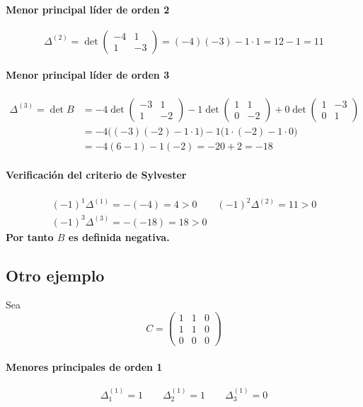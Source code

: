 \documentclass{article}
\begin{document}
\paragraph*{Menor principal líder de orden 2}
\[
\Delta^{(2)}=\det\begin{pmatrix}-4&1\\1&-3\end{pmatrix}=(-4)(-3)-1\cdot1=12-1=11
\]

\paragraph*{Menor principal líder de orden 3}
\[
\begin{aligned}
\Delta^{(3)}=\det B&=-4\det\begin{pmatrix}-3&1\\1&-2\end{pmatrix}-1\det\begin{pmatrix}1&1\\0&-2\end{pmatrix}+0\det\begin{pmatrix}1&-3\\0&1\end{pmatrix}\\
&=-4\bigl((-3)(-2)-1\cdot1\bigr)-1\bigl(1\cdot(-2)-1\cdot0\bigr)\\
&=-4(6-1)-1(-2)=-20+2=-18
\end{aligned}
\]

\paragraph*{Verificación del criterio de Sylvester}
\[
\begin{gathered}
(-1)^1\Delta^{(1)}=-(-4)=4>0\qquad(-1)^2\Delta^{(2)}=11>0\\
(-1)^3\Delta^{(3)}=-(-18)=18>0
\end{gathered}
\]
\textbf{\color{teal}Por tanto \(B\) es definida negativa.}

\subsection*{Otro ejemplo}

Sea
\[
C=\begin{pmatrix}
1&1&0\\
1&1&0\\
0&0&0
\end{pmatrix}
\]

\paragraph*{Menores principales de orden 1}
\[
\Delta^{(1)}_1=1\qquad\Delta^{(1)}_2=1\qquad\Delta^{(1)}_3=0
\]
\end{document}
